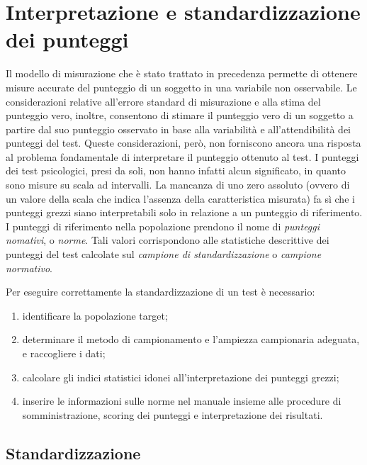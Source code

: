 \chapter{Interpretazione e standardizzazione dei punteggi}
\label{ch:standardizzazione}

Il modello di misurazione che è stato trattato in precedenza permette di ottenere misure accurate del punteggio di un soggetto in una variabile non osservabile. Le considerazioni relative all'errore standard di misurazione e alla stima del punteggio vero, inoltre, consentono di stimare il punteggio vero di un soggetto a partire dal suo punteggio osservato in base alla variabilità e all'attendibilità dei punteggi del test. Queste considerazioni, però, non forniscono ancora una risposta al problema fondamentale di interpretare il punteggio ottenuto al test. I punteggi dei test psicologici, presi da soli, non hanno infatti alcun significato, in quanto sono misure su scala ad intervalli.  La mancanza di uno zero assoluto (ovvero di un valore della scala che indica l'assenza della caratteristica misurata) fa sì che i punteggi grezzi siano interpretabili solo in relazione a un punteggio di riferimento. I punteggi di riferimento nella popolazione prendono il nome di \textit{punteggi nomativi}, o \textit{norme}. Tali valori corrispondono alle statistiche descrittive  dei punteggi del test calcolate sul \textit{campione di standardizzazione} o \textit{campione normativo}. 

Per eseguire correttamente la standardizzazione di un test è necessario:
\begin{enumerate}
\item identificare la popolazione target;
\item determinare il metodo di campionamento e l'ampiezza campionaria adeguata, e raccogliere i dati;
\item calcolare gli indici statistici idonei all'interpretazione dei punteggi grezzi; 
\item inserire le informazioni sulle norme nel manuale insieme alle procedure di somministrazione, scoring dei punteggi e interpretazione dei risultati.
\end{enumerate}

\section{Standardizzazione}

